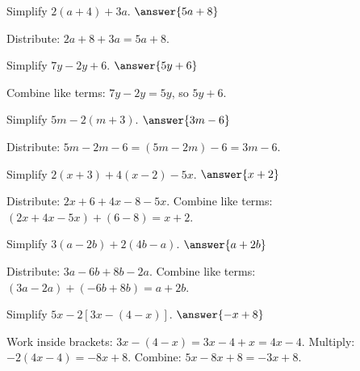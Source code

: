 \documentclass{ximera}
\begin{document}
\begin{problem}
Simplify $2(a + 4) + 3a$. $\answer{5a + 8}$
\begin{feedback}
Distribute: $2a + 8 + 3a = 5a + 8$.
\end{feedback}
\end{problem}

\begin{problem}
Simplify $7y - 2y + 6$. $\answer{5y + 6}$
\begin{feedback}
Combine like terms: $7y - 2y = 5y$, so $5y + 6$.
\end{feedback}
\end{problem}

\begin{problem}
Simplify $5m - 2(m + 3)$. $\answer{3m - 6}$
\begin{feedback}
Distribute: $5m - 2m - 6 = (5m - 2m) - 6 = 3m - 6$.
\end{feedback}
\end{problem}



\begin{problem}
Simplify $2(x + 3) + 4(x - 2) - 5x$. $\answer{x + 2}$
\begin{feedback}
Distribute: $2x + 6 + 4x - 8 - 5x$. Combine like terms: $(2x + 4x - 5x) + (6 - 8) = x + 2$.
\end{feedback}
\end{problem}

\begin{problem}
Simplify $3(a - 2b) + 2(4b - a)$. $\answer{a + 2b}$
\begin{feedback}
Distribute: $3a - 6b + 8b - 2a$. Combine like terms: $(3a - 2a) + (-6b + 8b) = a + 2b$.
\end{feedback}
\end{problem}

\begin{problem}
Simplify $5x - 2[3x - (4 - x)]$. $\answer{-x + 8}$
\begin{feedback}
Work inside brackets: $3x - (4 - x) = 3x - 4 + x = 4x - 4$. Multiply: $-2(4x - 4) = -8x + 8$. Combine: $5x - 8x + 8 = -3x + 8$.
\end{feedback}
\end{problem}

\end{document}

